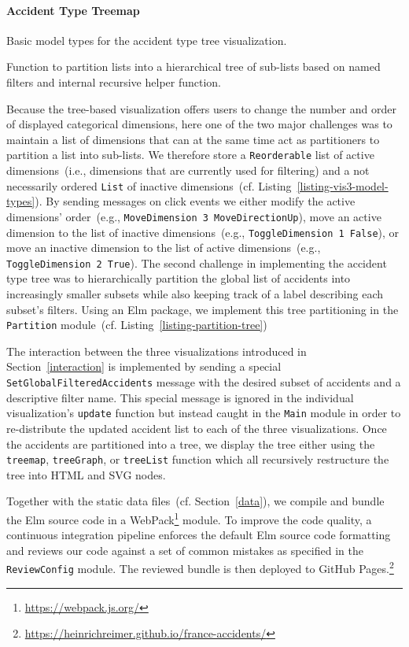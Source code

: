 \paragraph{Accident Type Treemap}
\begin{listing}
    
    \caption{Basic model types for the accident type tree visualization.}
    \label{listing-vis3-model-types}
\end{listing}
\begin{listing}
    
    \caption{Function to partition lists into a hierarchical tree of sub-lists based on named filters and internal recursive helper function.}
    \label{listing-partition-tree}
\end{listing}
Because the tree-based visualization offers users to change the number and order of displayed categorical dimensions, here one of the two major challenges was to maintain a list of dimensions that can at the same time act as partitioners to partition a list into sub-lists.
We therefore store a \lstinline{Reorderable} list of active dimensions~(i.e., dimensions that are currently used for filtering) and a not necessarily ordered \lstinline{List} of inactive dimensions~(cf. Listing~\ref{listing-vis3-model-types}).
By sending messages on click events we either modify the active dimensions' order~(e.g., \lstinline{MoveDimension 3 MoveDirectionUp}), move an active dimension to the list of inactive dimensions~(e.g., \lstinline{ToggleDimension 1 False}), or move an inactive dimension to the list of active dimensions~(e.g., \lstinline{ToggleDimension 2 True}).
The second challenge in implementing the accident type tree was to hierarchically partition the global list of accidents into increasingly smaller subsets while also keeping track of a label describing each subset's filters.
Using an Elm package, we implement this tree partitioning in the \lstinline{Partition} module~(cf. Listing~\ref{listing-partition-tree})

The interaction between the three visualizations introduced in Section~\ref{interaction} is implemented by sending a special \lstinline{SetGlobalFilteredAccidents} message with the desired subset of accidents and a descriptive filter name. This special message is ignored in the individual visualization's \lstinline{update} function but instead caught in the \lstinline{Main} module in order to re-distribute the updated accident list to each of the three visualizations.
Once the accidents are partitioned into a tree, we display the tree either using the \lstinline{treemap}, \lstinline{treeGraph}, or \lstinline{treeList} function which all recursively restructure the tree into HTML and SVG nodes.

Together with the static data files~(cf. Section~\ref{data}), we compile and bundle the Elm source code in a WebPack\footnote{\url{https://webpack.js.org/}} module. To improve the code quality, a continuous integration pipeline enforces the default Elm source code formatting and reviews our code against a set of common mistakes as specified in the \lstinline{ReviewConfig} module.
The reviewed bundle is then deployed to GitHub Pages.\footnote{\url{https://heinrichreimer.github.io/france-accidents/}}
